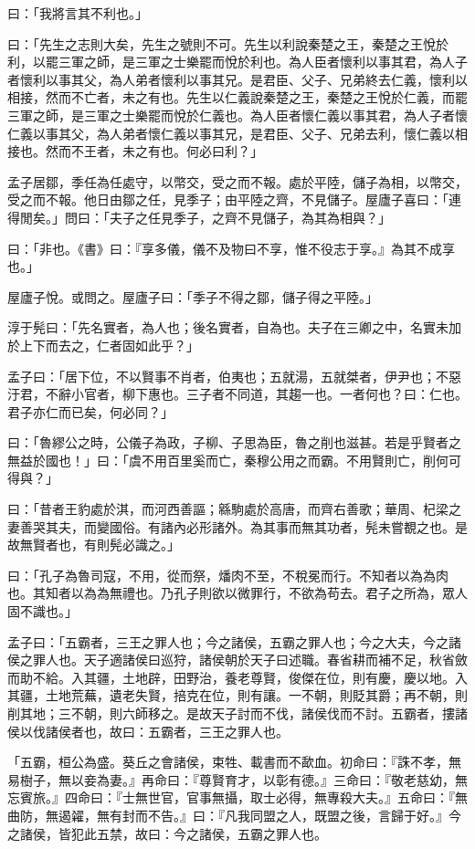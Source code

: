 \begin{pinyinscope}
曰：「我將言其不利也。」

曰：「先生之志則大矣，先生之號則不可。先生以利說秦楚之王，秦楚之王悅於利，以罷三軍之師，是三軍之士樂罷而悅於利也。為人臣者懷利以事其君，為人子者懷利以事其父，為人弟者懷利以事其兄。是君臣、父子、兄弟終去仁義，懷利以相接，然而不亡者，未之有也。先生以仁義說秦楚之王，秦楚之王悅於仁義，而罷三軍之師，是三軍之士樂罷而悅於仁義也。為人臣者懷仁義以事其君，為人子者懷仁義以事其父，為人弟者懷仁義以事其兄，是君臣、父子、兄弟去利，懷仁義以相接也。然而不王者，未之有也。何必曰利？」

孟子居鄒，季任為任處守，以幣交，受之而不報。處於平陸，儲子為相，以幣交，受之而不報。他日由鄒之任，見季子；由平陸之齊，不見儲子。屋廬子喜曰：「連得閒矣。」問曰：「夫子之任見季子，之齊不見儲子，為其為相與？」

曰：「非也。《書》曰：『享多儀，儀不及物曰不享，惟不役志于享。』為其不成享也。」

屋廬子悅。或問之。屋廬子曰：「季子不得之鄒，儲子得之平陸。」

淳于髡曰：「先名實者，為人也；後名實者，自為也。夫子在三卿之中，名實未加於上下而去之，仁者固如此乎？」

孟子曰：「居下位，不以賢事不肖者，伯夷也；五就湯，五就桀者，伊尹也；不惡汙君，不辭小官者，柳下惠也。三子者不同道，其趨一也。一者何也？曰：仁也。君子亦仁而已矣，何必同？」

曰：「魯繆公之時，公儀子為政，子柳、子思為臣，魯之削也滋甚。若是乎賢者之無益於國也！」曰：「虞不用百里奚而亡，秦穆公用之而霸。不用賢則亡，削何可得與？」

曰：「昔者王豹處於淇，而河西善謳；緜駒處於高唐，而齊右善歌；華周、杞梁之妻善哭其夫，而變國俗。有諸內必形諸外。為其事而無其功者，髡未嘗覩之也。是故無賢者也，有則髡必識之。」

曰：「孔子為魯司寇，不用，從而祭，燔肉不至，不稅冕而行。不知者以為為肉也。其知者以為為無禮也。乃孔子則欲以微罪行，不欲為苟去。君子之所為，眾人固不識也。」

孟子曰：「五霸者，三王之罪人也；今之諸侯，五霸之罪人也；今之大夫，今之諸侯之罪人也。天子適諸侯曰巡狩，諸侯朝於天子曰述職。春省耕而補不足，秋省斂而助不給。入其疆，土地辟，田野治，養老尊賢，俊傑在位，則有慶，慶以地。入其疆，土地荒蕪，遺老失賢，掊克在位，則有讓。一不朝，則貶其爵；再不朝，則削其地；三不朝，則六師移之。是故天子討而不伐，諸侯伐而不討。五霸者，摟諸侯以伐諸侯者也，故曰：五霸者，三王之罪人也。

「五霸，桓公為盛。葵丘之會諸侯，束牲、載書而不歃血。初命曰：『誅不孝，無易樹子，無以妾為妻。』再命曰：『尊賢育才，以彰有德。』三命曰：『敬老慈幼，無忘賓旅。』四命曰：『士無世官，官事無攝，取士必得，無專殺大夫。』五命曰：『無曲防，無遏糴，無有封而不告。』曰：『凡我同盟之人，既盟之後，言歸于好。』今之諸侯，皆犯此五禁，故曰：今之諸侯，五霸之罪人也。


\end{pinyinscope}
